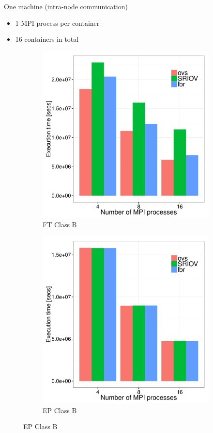 \documentclass[11pt,xcolor=dvipsnames,presentation]{beamer}
\begin{document}
\begin{frame}[label=sec-3-0-11]{One machine (intra-node communication)}
\begin{itemize}
\item 1 MPI process per container
\item 16 containers in total
\end{itemize}

\begin{figure}
  \centering
  \begin{subfigure}[b]{0.42\textwidth}
    \caption{FT Class B}
    \includegraphics[scale=0.25,angle=0]{figures/intra-container-ftB.pdf}
  \end{subfigure}
  \begin{subfigure}[b]{0.42\textwidth}
    \caption{EP Class B}
    \includegraphics[scale=0.25,angle=0]{figures/intra-container-epB.pdf}

\end{subfigure}
\end{figure}
\end{frame}
\end{document}
